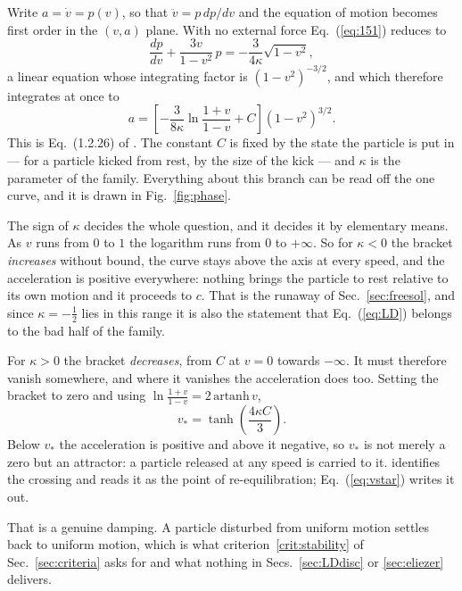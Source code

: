 \documentclass[preprint]{aastex701}
\begin{document}
Write $a = \dot v = p(v)$, so that $\ddot v = p\,dp/dv$ and the equation of
motion becomes first order in the $(v,a)$ plane. With no external force
Eq.~(\ref{eq:151}) reduces to
\begin{equation}
\frac{dp}{dv} + \frac{3v}{1-v^2}\,p
= -\frac{3}{4\kappa}\sqrt{1-v^2},
\label{eq:phaseode}
\end{equation}
a linear equation whose integrating factor is $(1-v^2)^{-3/2}$, and which
therefore integrates at once to
\begin{equation}
a = \left[-\frac{3}{8\kappa}\ln\frac{1+v}{1-v} + C\right](1-v^2)^{3/2}.
\label{eq:phase}
\end{equation}
This is Eq.~(1.2.26) of \citet{zhang2006}. The constant $C$ is fixed by the
state the particle is put in --- for a particle kicked from rest, by the size
of the kick --- and $\kappa$ is the parameter of the family. Everything about
this branch can be read off the one curve, and it is drawn in
Fig.~\ref{fig:phase}.

The sign of $\kappa$ decides the whole question, and it decides it by
elementary means. As $v$ runs from $0$ to $1$ the logarithm runs from $0$ to
$+\infty$. So for $\kappa<0$ the bracket \emph{increases} without bound, the
curve stays above the axis at every speed, and the acceleration is positive
everywhere: nothing brings the particle to rest relative to its own motion and
it proceeds to $c$. That is the runaway of Sec.~\ref{sec:freesol}, and since
$\kappa=-\tfrac12$ lies in this range it is also the statement that
Eq.~(\ref{eq:LD}) belongs to the bad half of the family.

For $\kappa>0$ the bracket \emph{decreases}, from $C$ at $v=0$ towards
$-\infty$. It must therefore vanish somewhere, and where it vanishes the
acceleration does too. Setting the bracket to zero and using
$\ln\frac{1+v}{1-v} = 2\,\mathrm{artanh}\,v$,
\begin{equation}
v_* = \tanh\!\left(\frac{4\kappa C}{3}\right).
\label{eq:vstar}
\end{equation}
Below $v_*$ the acceleration is positive and above it negative, so $v_*$ is not
merely a zero but an attractor: a particle released at any speed is carried to
it. \citet{zhang2006} identifies the crossing and reads it as the point of
re-equilibration; Eq.~(\ref{eq:vstar}) writes it out.

That is a genuine damping. A particle disturbed from uniform motion settles
back to uniform motion, which is what criterion~\ref{crit:stability} of
Sec.~\ref{sec:criteria} asks for and what nothing in
Secs.~\ref{sec:LDdisc} or \ref{sec:eliezer} delivers.
\end{document}
